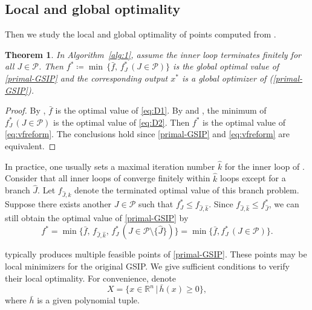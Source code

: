\documentclass{amsart}
\newcommand{\reff}[1]{(\ref{#1})}
\newtheorem{theorem}{Theorem}[section]
\theoremstyle{plain}
\newcommand{\re}{\mathbb{R}}
\newcommand{\mc}[1]{\mathcal{#1}}
\numberwithin{equation}{section}
\begin{document}
		
		\subsection{Local and global optimality}\label{ssc:gloloc}
		Then we study the local and global optimality of points computed from .
		\begin{theorem}\label{thm:glomin}
			In Algorithm~\ref{alg:1}, assume the inner loop terminates finitely
			for all $J\in \mc{P}$. 
			Then $f^*\coloneqq \min\, \{\bar{f},\, f_J^*\,(J\in \mc{P})\}$ 
			is the global optimal value 
			of \eqref{primal-GSIP} and the corresponding output $x^*$ is a global optimizer of \reff{primal-GSIP}.
		\end{theorem}
		\begin{proof}
			By , $\bar{f}$ is the optimal value of \eqref{eq:D1}.
			By  and , the minimum of $f_J^*\, (J\in \mc{P})$
			is the optimal value of \eqref{eq:D2}.
			Then $f^*$ is the optimal value of \eqref{eq:vfreform}.
			The conclusions hold since \eqref{primal-GSIP} and \eqref{eq:vfreform} are equivalent.
		\end{proof}
		
		In practice, one usually sets a maximal iteration number $\hat{k}$ for the inner loop of . 
		Consider that all inner loops of  converge finitely within $\hat{k}$
		loops except for a branch $\hat{J}$.
		Let $f_{\hat{J}, \hat{k}}$ denote the terminated optimal value of this branch problem.
		Suppose there exists another $J\in \mc{P}$ such that $f_J^*\le f_{\hat{J},\hat{k}}$. 
		Since $f_{\hat{J}, \hat{k}}\le f_{\hat{J}}^*$,
		we can still obtain the optimal value of \eqref{primal-GSIP} by
		\[ f^* = 
		\min \big\{\bar{f},\, f_{\hat{J},\hat{k}},\, f_J^*\, (J\in \mc{P}\setminus \{\hat{J}\})\big\} = \min\{\bar{f}, f_J^*\, (J\in \mc{P})\}.  
		\]
		
		
		 typically produces multiple feasible points of \eqref{primal-GSIP}.
		These points may be local minimizers for the original GSIP.
		We give sufficient conditions to verify their local optimality.
            For convenience, denote
            \[ X=\{x\in\re^n\,\vert\, \bar{h}(x)\ge 0\},\] 
            where $\bar{h}$ is a given polynomial tuple.
        
\end{document}
